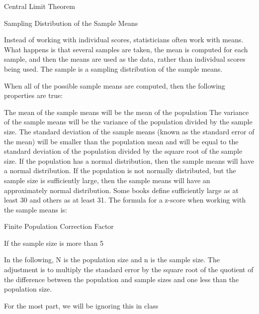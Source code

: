 Central Limit Theorem

Sampling Distribution of the Sample Means


Instead of working with individual scores, statisticians often work with means. What happens is that several samples are taken, the mean is computed for each sample, and then the means are used as the data, rather than individual scores being used. The sample is a sampling distribution of the sample means.

When all of the possible sample means are computed, then the following properties are true:

The mean of the sample means will be the mean of the population
The variance of the sample means will be the variance of the population divided by the sample size.
The standard deviation of the sample means (known as the standard error of the mean) will be smaller than the population mean and will be equal to the standard deviation of the population divided by the square root of the sample size.
If the population has a normal distribution, then the sample means will have a normal distribution.
If the population is not normally distributed, but the sample size is sufficiently large, then the sample means will have an approximately normal distribution. Some books define sufficiently large as at least 30 and others as at least 31.
The formula for a z-score when working with the sample means is:

Finite Population Correction Factor

If the sample size is more than 5%

In the following, N is the population size and n is the sample size. The adjustment is to multiply the standard error by the square root of the quotient of the difference between the population and sample sizes and one less than the population size.  

For the most part, we will be ignoring this in class
